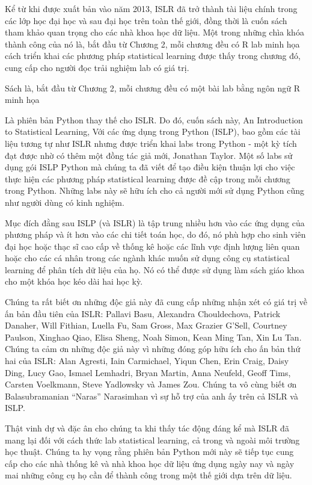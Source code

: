 Kể từ khi được xuất bản vào năm 2013, ISLR đã trở thành tài liệu chính trong các lớp học đại học và sau đại học trên toàn thế giới, đồng thời là cuốn sách tham khảo quan trọng cho các nhà khoa học dữ liệu. Một trong những chìa khóa thành công của nó là, bắt đầu từ Chương 2, mỗi chương đều có R lab minh họa cách triển khai các phương pháp statistical learning được thấy trong chương đó, cung cấp cho người đọc trải nghiệm lab có giá trị.

Sách là, bắt đầu từ Chương 2, mỗi chương đều có một bài lab bằng ngôn ngữ R minh họa

Là phiên bản Python thay thế cho ISLR. Do đó, cuốn sách này, An Introduction to Statistical Learning, Với các ứng dụng trong Python (ISLP), bao gồm các tài liệu tương tự như ISLR nhưng được triển khai labs trong Python - một kỳ tích đạt được nhờ có thêm một đồng tác giả mới, Jonathan Taylor. Một số labs sử dụng gói ISLP Python mà chúng ta đã viết để tạo điều kiện thuận lợi cho việc thực hiện các phương pháp statistical learning được đề cập trong mỗi chương trong Python. Những labs này sẽ hữu ích cho cả người mới sử dụng Python cũng như người dùng có kinh nghiệm.

Mục đích đằng sau ISLP (và ISLR) là tập trung nhiều hơn vào các ứng dụng của phương pháp và ít hơn vào các chi tiết toán học, do đó, nó phù hợp cho sinh viên đại học hoặc thạc sĩ cao cấp về thống kê hoặc các lĩnh vực định lượng liên quan hoặc cho các cá nhân trong các ngành khác muốn sử dụng công cụ statistical learning để phân tích dữ liệu của họ. Nó có thể được sử dụng làm sách giáo khoa cho một khóa học kéo dài hai học kỳ.

Chúng ta rất biết ơn những độc giả này đã cung cấp những nhận xét có giá trị về ấn bản đầu tiên của ISLR: Pallavi Basu, Alexandra Chouldechova, Patrick Danaher, Will Fithian, Luella Fu, Sam Gross, Max Grazier G'Sell, Courtney Paulson, Xinghao Qiao, Elisa Sheng, Noah Simon, Kean Ming Tan, Xin Lu Tan. Chúng ta cảm ơn những độc giả này vì những đóng góp hữu ích cho ấn bản thứ hai của ISLR: Alan Agresti, Iain Carmichael, Yiqun Chen, Erin Craig, Daisy Ding, Lucy Gao, Ismael Lemhadri, Bryan Martin, Anna Neufeld, Geoff Tims, Carsten Voelkmann, Steve Yadlowsky và James Zou. Chúng ta vô cùng biết ơn Balasubramanian “Naras” Narasimhan vì sự hỗ trợ của anh ấy trên cả ISLR và ISLP.

Thật vinh dự và đặc ân cho chúng ta khi thấy tác động đáng kể mà ISLR đã mang lại đối với cách thức lab statistical learning, cả trong và ngoài môi trường học thuật. Chúng ta hy vọng rằng phiên bản Python mới này sẽ tiếp tục cung cấp cho các nhà thống kê và nhà khoa học dữ liệu ứng dụng ngày nay và ngày mai những công cụ họ cần để thành công trong một thế giới dựa trên dữ liệu.

